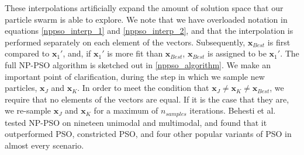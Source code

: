 These interpolations artificially expand the amount of solution space that our particle swarm is able to explore. We note that we have overloaded notation in equations \ref{nppso_interp_1} and \ref{nppso_interp_2}, and that the interpolation is performed separately on each element of the vectors. Subsequently, $\mathbf{x}_{Best}$ is first compared to $\mathbf{x}_1'$, and, if $\mathbf{x}_1'$ is more fit than $\mathbf{x}_{Best}$, $\mathbf{x}_{Best}$ is assigned to be $\mathbf{x}_1'$. The full NP-PSO algorithm is sketched out in \ref{nppso_algorithm}. We make an important point of clarification, during the step in which we sample new particles, $\mathbf{x}_J$ and $\mathbf{x}_K$. In order to meet the condition that $\mathbf{x}_J \neq \mathbf{x}_K \neq \mathbf{x}_{Best}$, we require that no elements of the vectors are equal. If it is the case that they are, we re-sample $\mathbf{x}_J$ and $\mathbf{x}_K$ for a maximum of $n_{samples}$ iterations. Behesti et al. tested NP-PSO on nineteen unimodal and  multimodal, and found that it outperformed PSO, constricted PSO, and four other popular variants of PSO in almost every scenario. 

